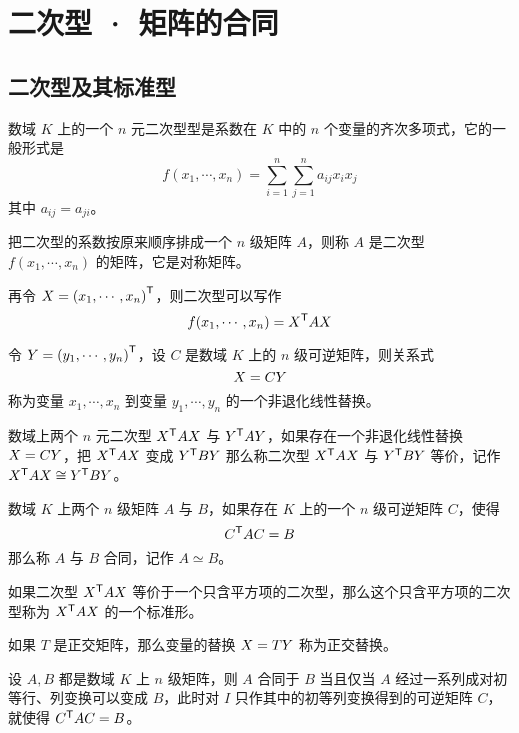 \chapter{二次型 · 矩阵的合同}

\section{二次型及其标准型}

\begin{definition}
    数域 $K$ 上的一个 $n$ 元二次型型是系数在 $K$ 中的 $n$ 个变量的齐次多项式，它的一般形式是
    \[f(x_1,\cdots,x_n) = \sum_{i=1}^n\sum_{j=1}^na_{ij}x_ix_j\]
    其中 $a_{ij} = a_{ji}$。
\end{definition}

把二次型的系数按原来顺序排成一个 $n$ 级矩阵 $A$，则称 $A$ 是二次型 $f(x_1,\cdots,x_n)$ 的矩阵，它是对称矩阵。

再令 $X = {(x_1,\cdots,x_n)}^\mathsf{T}$，则二次型可以写作
\[f(x_1,\cdots,x_n) = {X}^\mathsf{T}AX\]

令 $Y = {(y_1,\cdots,y_n)}^\mathsf{T}$，设 $C$ 是数域 $K$ 上的 $n$ 级可逆矩阵，则关系式
\[X = CY\]
称为变量 $x_1,\cdots,x_n$ 到变量 $y_1,\cdots,y_n$ 的一个非退化线性替换。

\begin{definition}
    数域上两个 $n$ 元二次型 ${X}^\mathsf{T}AX$ 与 ${Y}^\mathsf{T}AY$，如果存在一个非退化线性替换 $X = CY$，把 ${X}^\mathsf{T}AX$ 变成 ${Y}^\mathsf{T}BY$ 那么称二次型 ${X}^\mathsf{T}AX$ 与 ${Y}^\mathsf{T}BY$ 等价，记作 ${X}^\mathsf{T}AX \cong {Y}^\mathsf{T}BY$。
\end{definition}

\begin{definition}
    数域 $K$ 上两个 $n$ 级矩阵 $A$ 与 $B$，如果存在 $K$ 上的一个 $n$ 级可逆矩阵 $C$，使得
    \[{C}^\mathsf{T}AC = B\]
    那么称 $A$ 与 $B$ 合同，记作 $A\simeq B$。
\end{definition}

如果二次型 ${X}^\mathsf{T} A X$ 等价于一个只含平方项的二次型，那么这个只含平方项的二次型称为 ${X}^\mathsf{T}AX$ 的一个标准形。

如果 $T$ 是正交矩阵，那么变量的替换 $X = TY$ 称为正交替换。

\begin{theorem}
    设 $A,B$ 都是数域 $K$ 上 $n$ 级矩阵，则 $A$ 合同于 $B$ 当且仅当 $A$ 经过一系列成对初等行、列变换可以变成 $B$，此时对 $I$ 只作其中的初等列变换得到的可逆矩阵 $C$，就使得 ${C}^\mathsf{T}AC=B$。
\end{theorem}

